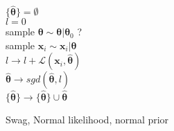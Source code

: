 \begin{algorithm}

  \Output{$\{\bm{\hat{\theta}}\}$}
  $\{\bm{\hat{\theta}}\} = \emptyset$\\
  {
    {
      $l = 0$ \\
      {
        sample $\bm{\theta} \sim \bm{\theta} | \bm{\theta}_0$ ?\\
        sample $\bm{x}_i \sim \bm{x}_i | \bm{\theta}$\\
        $l \to l + \mathcal{L}(\bm{x}_i, \bm{\hat{\theta}})$\\
      }
      $\bm{\hat{\theta}} \to sgd(\bm{\hat{\theta}}, l)$ \\
      $\{\bm{\hat{\theta}}\} \to \{\bm{\hat{\theta}}\} \cup \bm{\hat{\theta}}$ \\
    }
  }
  \caption{Swag, Normal likelihood, normal prior}\label{alg:swag_gaussian}
\end{algorithm}


